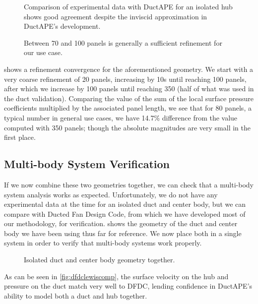 \begin{figure}[h!]
    \centering
        
        \caption{Comparison of experimental data with DuctAPE for an isolated hub shows good agreement despite the inviscid approximation in DuctAPE's development.}
    \label{fig:isolatedhubvalidation}
\end{figure}

\begin{figure}[hb!]
    \centering
        \caption{Between 70 and 100 panels is generally a sufficient refinement for our use case.}
    \label{fig:isolatedhubgridconv}
\end{figure}


 shows a refinement convergence for the aforementioned geometry.
%
We start with a very coarse refinement of 20 panels, increasing by 10s until reaching 100 panels, after which we increase by 100 panels until reaching 350 (half of what was used in the duct validation).
%
Comparing the value of the sum of the local surface pressure coefficients multiplied by the associated panel length, we see that for 80 panels, a typical number in general use cases, we have 14.7\% difference from the value computed with 350 panels; though the absolute magnitudes are very small in the first place.


\subsection{Multi-body System Verification}

If we now combine these two geometries together, we can check that a multi-body system analysis works as expected.
%
Unfortunately, we do not have any experimental data at the time for an isolated duct and center body, but we can compare with Ducted Fan Design Code, from which we have developed most of our methodology, for verification.
%
 shows the geometry of the duct and center body we have been using thus far for reference.
%
We now place both in a single system in order to verify that multi-body systems work properly.

\begin{figure}[hb!]
    \centering
        \caption{Isolated duct and center body geometry together.}
    \label{fig:ducthubvalgeom}
\end{figure}
%
As can be seen in \cref{fig:dfdclewiscomp}, the surface velocity on the hub and pressure on the duct match very well to DFDC, lending confidence in DuctAPE's ability to model both a duct and hub together.

